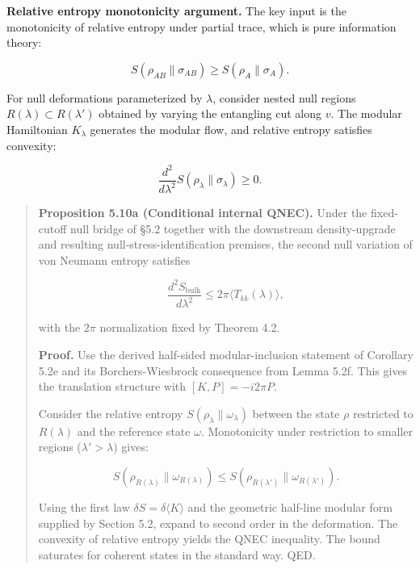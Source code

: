 \textbf{Relative entropy monotonicity argument.} The key input is the monotonicity of relative entropy under partial trace, which is pure information theory:

\[
S(\rho_{AB} \| \sigma_{AB}) \ge S(\rho_A \| \sigma_A).
\]

For null deformations parameterized by \(\lambda\), consider nested null regions \(R(\lambda) \subset R(\lambda')\) obtained by varying the entangling cut along \(v\). The modular Hamiltonian \(K_\lambda\) generates the modular flow, and relative entropy satisfies convexity:

\[
\frac{d^2}{d\lambda^2} S(\rho_\lambda \| \sigma_\lambda) \ge 0.
\]

\begin{quote}
\textbf{Proposition 5.10a (Conditional internal QNEC).} Under the fixed-cutoff null bridge of \S{}5.2 together with the downstream density-upgrade and resulting null-stress-identification premises, the second null variation of von Neumann entropy satisfies

\[
\frac{d^2 S_{\mathrm{bulk}}}{d\lambda^2} \le 2\pi \langle T_{kk}(\lambda) \rangle,
\]

with the \(2\pi\) normalization fixed by Theorem 4.2.

\textbf{Proof.} Use the derived half-sided modular-inclusion statement of Corollary 5.2e and its Borchers-Wiesbrock consequence from Lemma 5.2f. This gives the translation structure with \([K, P] = - i 2\pi P\).

Consider the relative entropy \(S(\rho_\lambda \| \omega_\lambda)\) between the state \(\rho\) restricted to \(R(\lambda)\) and the reference state \(\omega\). Monotonicity under restriction to smaller regions (\(\lambda' > \lambda\)) gives:

\[
S(\rho_{R(\lambda)} \| \omega_{R(\lambda)}) \le S(\rho_{R(\lambda')} \| \omega_{R(\lambda')}).
\]

Using the first law \(\delta S = \delta \langle K \rangle\) and the geometric half-line modular form supplied by Section 5.2, expand to second order in the deformation. The convexity of relative entropy yields the QNEC inequality. The bound saturates for coherent states in the standard way. QED.
\end{quote}

